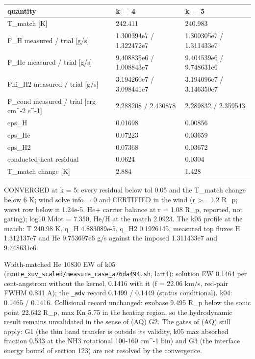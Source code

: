 \documentclass[english,a4paper]{my_memo}
\begin{document}
{\def\LTcaptype{none} %
{\small
\begin{longtable}[]{@{}lll@{}}
\toprule\noalign{}
quantity & k = 4 & k = 5 \\
\midrule\noalign{}
\endhead
\bottomrule\noalign{}
\endlastfoot
T\_match {[}K{]} & 242.411 & 240.983 \\
F\_H measured / trial {[}g/s{]} & 1.300394e7 / 1.322472e7 & 1.300305e7 / 1.311433e7 \\
F\_He measured / trial {[}g/s{]} & 9.408835e6 / 1.008843e7 & 9.404539e6 / 9.748631e6 \\
Phi\_H2 measured / trial {[}g/s{]} & 3.194260e7 / 3.098441e7 & 3.194096e7 / 3.146350e7 \\
F\_cond measured / trial {[}erg cm\^{}-2 s\^{}-1{]} & 2.288208 / 2.430878 & 2.289832 / 2.359543 \\
eps\_H & 0.01698 & 0.00856 \\
eps\_He & 0.07223 & 0.03659 \\
eps\_H2 & 0.07368 & 0.03672 \\
conducted-heat residual & 0.0624 & 0.0304 \\
T\_match change {[}K{]} & 2.884 & 1.428 \\
\end{longtable}
}
}

CONVERGED at k = 5: every residual below tol 0.05 and the T\_match change below 6 K;
wind solve info = 0 and CERTIFIED in the wind (r \textgreater= 1.2 R\_p; worst row below it 1.24e-5, He+ carrier balance at r = 1.08 R\_p, reported, not gating); log10 Mdot = 7.350, He/H at the
match 2.0923. The k05 profile at the match: T 240.98 K, q\_H 4.883089e-5, q\_H2
0.1926145, measured top fluxes H 1.312137e7 and He 9.753697e6 g/s against the
imposed 1.311433e7 and 9.748631e6.

Width-matched He 10830 EW of k05 (\texttt{route\_xuv\_scaled/measure\_case\_a76da494.sh},
lart4): solution EW 0.1464 per cent-angstrom without the kernel, 0.1416 with it
(f = 22.06 km/s, red-pair FWHM 0.841 A); the \texttt{\_adv} record 0.1499 / 0.1449
(status conditional). k04: 0.1465 / 0.1416. Collisional record unchanged: exobase
9.495 R\_p below the sonic point 22.642 R\_p, max Kn 5.75 in the heating region, so
the hydrodynamic result remains unvalidated in the sense of (AQ) G2. The gates of
(AQ) still apply: G1 (the thin band transfer is outside its validity, k05 max
absorbed fraction 0.533 at the NH3 rotational 100-160 cm\^{}-1 bin) and G3 (the
interface energy bound of section 123) are not resolved by the convergence.
\end{document}
